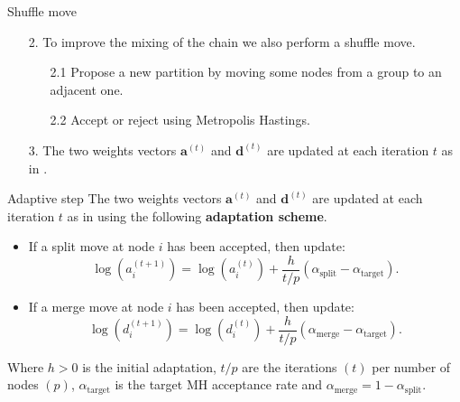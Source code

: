 \begin{frame}{Shuffle move}
    \begin{enumerate}
        \item[2.] To improve the mixing of the chain we also perform a \alert{shuffle move}.
            \begin{enumerate}
                \item[2.1] Propose a new partition by moving some nodes from a group to an adjacent one.
                \item[2.2] Accept or reject using Metropolis Hastings.
            \end{enumerate}

        \vspace*{0.5cm}
        \item[3.] The two weights vectors $\bm{a}^{(t)}$ and $\bm{d}^{(t)}$ are updated at each iteration $t$ as in \cite{bensonAdaptiveMCMCMultiple2018}.
    \end{enumerate}

\end{frame}



\begin{frame}{Adaptive step}
    The two weights vectors $\bm{a}^{(t)}$ and $\bm{d}^{(t)}$ are updated at each iteration $t$ as in \cite{bensonAdaptiveMCMCMultiple2018} using the following \textbf{adaptation scheme}.
    \pause
    
    \begin{itemize}
        \item If a \alert{split} move at node $i$ has been accepted, then update:
        \[
            \log (a_i^{(t+1)})=\log (a_i^{(t)})+\frac{h}{t/p}(\alpha_{\text{split}}-\alpha_{\text{target}}) .
        \]
        \item If a \alert{merge} move at node $i$ has been accepted, then update:
        \[
            \log (d_i^{(t+1)})=\log (d_i^{(t)})+\frac{h}{t/p}(\alpha_{\text{merge}}-\alpha_{\text{target}}) .
        \]
    \end{itemize}
Where $h>0$ is the initial adaptation, $t/p$ are the iterations $(t)$ per number of nodes $(p)$, $\alpha_{\text{target}}$ is the target MH acceptance rate and $\alpha_{\text{merge}} = 1 - \alpha_{\text{split}}$.
\end{frame}